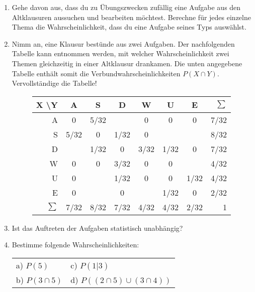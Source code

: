 \documentclass[11pt, a4paper]{article}
\begin{document}
\begin{enumerate}[label=\alph*)]
\item Gehe  davon aus, dass du zu Übungszwecken zufällig eine Aufgabe aus den Altklausuren aussuchen und bearbeiten möchtest. Berechne für jedes einzelne Thema die Wahrscheinlichkeit, dass du eine Aufgabe seines Typs auswählst.
\item Nimm an, eine Klausur bestünde aus zwei Aufgaben. Der nachfolgenden Tabelle kann entnommen werden, mit welcher Wahrscheinlichkeit zwei Themen gleichzeitig in einer Altklausur drankamen. Die unten angegebene Tabelle enthält somit die Verbundwahrscheinlichkeiten $P(X \cap Y)$. Vervollständige die Tabelle!

\begin{figure}[h!]
\centering
\setlength\extrarowheight{5pt}
\begin{tabular}{r|cccccc|r}
	X \textbackslash	Y	& A 	& S 	& D 	& W 	& U 	& E 	& $\sum$\\ \hline
	A 		& 0 	& 5/32 	&		& 0  	& 0  	& 0 	& 7/32 \\
	S 		& 5/32	& 0		& 1/32 	& 0 	& 		&		& 8/32 \\
	D 		& 		& 1/32 	& 0 	& 3/32 	& 1/32 	& 0  	& 7/32 \\
	W 		& 0		& 0 	& 3/32 	& 0 	& 0  	& 		& 4/32 \\
	U 		& 0  	& 	 	& 1/32 	& 0 	& 0  	& 1/32 	& 4/32 \\
	E 		& 0 	& 		& 0  	& 		& 1/32 	& 0 	& 2/32 \\ \hline
	$\sum$ 	& 7/32 	& 8/32 	& 7/32 	& 4/32 	& 4/32 	& 2/32  & 1\\
\end{tabular}
\end{figure}

\item Ist das Auftreten der Aufgaben statistisch unabhängig?\\
\item Bestimme folgende Wahrscheinlichkeiten:

	\begin{tabular}{ll}
	a) $P(5)$			\hspace{4cm}	& c) $P(1|3)$ \\
	b) $P(3 \cap 5)$ 	\hspace{4cm}	& d) $P((2\cap 5) \cup (3\cap 4))$\\
	\end{tabular}

\end{enumerate}
\end{document}
